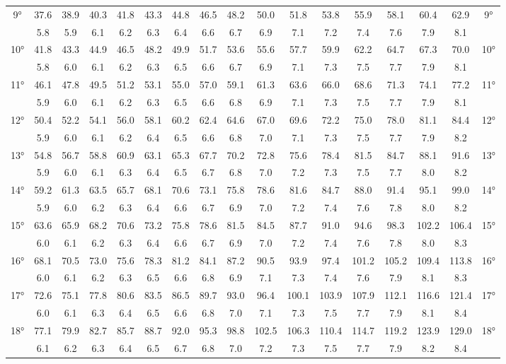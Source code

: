 \begin{footnotesize}
\begin{tabular}{c || c | c | c | c | c | c | c | c | c | c | c | c | c | c | c || c}
		\multirow{2}{*}{9°}&37.6&38.9&40.3&41.8&43.3&44.8&46.5&48.2&50.0&51.8&53.8&55.9&58.1&60.4&62.9&\multirow{2}{*}{9°}\\ \space&5.8&5.9&6.1&6.2&6.3&6.4&6.6&6.7&6.9&7.1&7.2&7.4&7.6&7.9&8.1&\space\\\hline
		\multirow{2}{*}{10°}&41.8&43.3&44.9&46.5&48.2&49.9&51.7&53.6&55.6&57.7&59.9&62.2&64.7&67.3&70.0&\multirow{2}{*}{10°}\\ \space&5.8&6.0&6.1&6.2&6.3&6.5&6.6&6.7&6.9&7.1&7.3&7.5&7.7&7.9&8.1&\space\\\hline
		\multirow{2}{*}{11°}&46.1&47.8&49.5&51.2&53.1&55.0&57.0&59.1&61.3&63.6&66.0&68.6&71.3&74.1&77.2&\multirow{2}{*}{11°}\\ \space&5.9&6.0&6.1&6.2&6.3&6.5&6.6&6.8&6.9&7.1&7.3&7.5&7.7&7.9&8.1&\space\\\hline
		\multirow{2}{*}{12°}&50.4&52.2&54.1&56.0&58.1&60.2&62.4&64.6&67.0&69.6&72.2&75.0&78.0&81.1&84.4&\multirow{2}{*}{12°}\\ \space&5.9&6.0&6.1&6.2&6.4&6.5&6.6&6.8&7.0&7.1&7.3&7.5&7.7&7.9&8.2&\space\\\hline
		\multirow{2}{*}{13°}&54.8&56.7&58.8&60.9&63.1&65.3&67.7&70.2&72.8&75.6&78.4&81.5&84.7&88.1&91.6&\multirow{2}{*}{13°}\\ \space&5.9&6.0&6.1&6.3&6.4&6.5&6.7&6.8&7.0&7.2&7.3&7.5&7.7&8.0&8.2&\space\\\hline
		\multirow{2}{*}{14°}&59.2&61.3&63.5&65.7&68.1&70.6&73.1&75.8&78.6&81.6&84.7&88.0&91.4&95.1&99.0&\multirow{2}{*}{14°}\\ \space&5.9&6.0&6.2&6.3&6.4&6.6&6.7&6.9&7.0&7.2&7.4&7.6&7.8&8.0&8.2&\space\\\hline
		\multirow{2}{*}{15°}&63.6&65.9&68.2&70.6&73.2&75.8&78.6&81.5&84.5&87.7&91.0&94.6&98.3&102.2&106.4&\multirow{2}{*}{15°}\\ \space&6.0&6.1&6.2&6.3&6.4&6.6&6.7&6.9&7.0&7.2&7.4&7.6&7.8&8.0&8.3&\space\\\hline
		\multirow{2}{*}{16°}&68.1&70.5&73.0&75.6&78.3&81.2&84.1&87.2&90.5&93.9&97.4&101.2&105.2&109.4&113.8&\multirow{2}{*}{16°}\\ \space&6.0&6.1&6.2&6.3&6.5&6.6&6.8&6.9&7.1&7.3&7.4&7.6&7.9&8.1&8.3&\space\\\hline
		\multirow{2}{*}{17°}&72.6&75.1&77.8&80.6&83.5&86.5&89.7&93.0&96.4&100.1&103.9&107.9&112.1&116.6&121.4&\multirow{2}{*}{17°}\\ \space&6.0&6.1&6.3&6.4&6.5&6.6&6.8&7.0&7.1&7.3&7.5&7.7&7.9&8.1&8.4&\space\\\hline
		\multirow{2}{*}{18°}&77.1&79.9&82.7&85.7&88.7&92.0&95.3&98.8&102.5&106.3&110.4&114.7&119.2&123.9&129.0&\multirow{2}{*}{18°}\\ \space&6.1&6.2&6.3&6.4&6.5&6.7&6.8&7.0&7.2&7.3&7.5&7.7&7.9&8.2&8.4&\space\\\hline

\end{tabular}
\end{footnotesize}
